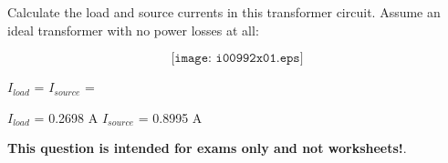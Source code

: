 

Calculate the load and source currents in this transformer circuit.  Assume an ideal transformer with no power losses at all:

$$\texttt{[image: i00992x01.eps]}$$

$I_{load}$ = \hskip 80pt $I_{source}$ = 

\vskip 10pt







$I_{load}$ = 0.2698 A \hskip 80pt $I_{source}$ = 0.8995 A







{\bf This question is intended for exams only and not worksheets!}.



